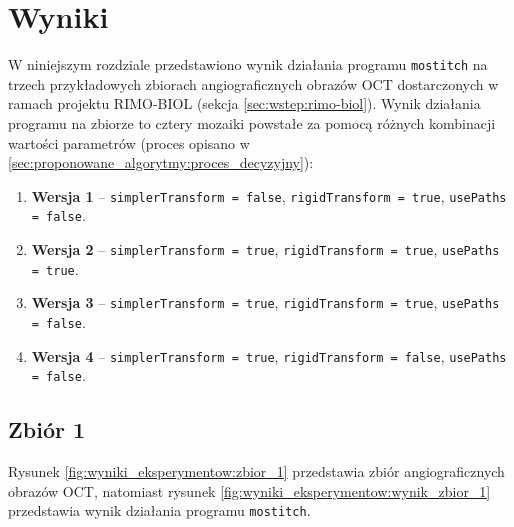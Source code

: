 %
\chapter{Wyniki}
\label{sec:wyniki_eksperymentow}

W niniejszym rozdziale przedstawiono wynik działania programu \texttt{mostitch} na trzech przykładowych zbiorach angiograficznych obrazów OCT dostarczonych w ramach projektu RIMO-BIOL (sekcja \ref{sec:wstep:rimo-biol}). Wynik działania programu na zbiorze to cztery mozaiki powstałe za pomocą różnych kombinacji wartości parametrów (proces opisano w \ref{sec:proponowane_algorytmy:proces_decyzyjny}):

\begin{enumerate}
\item \textbf{Wersja 1} -- \texttt{simplerTransform = false}, \texttt{rigidTransform = true}, \texttt{usePaths = false}. 
\item \textbf{Wersja 2} -- \texttt{simplerTransform = true}, \texttt{rigidTransform = true}, \texttt{usePaths = true}.
\item \textbf{Wersja 3} -- \texttt{simplerTransform = true}, \texttt{rigidTransform = true}, \texttt{usePaths = false}.
\item \textbf{Wersja 4} -- \texttt{simplerTransform = true}, \texttt{rigidTransform = false}, \texttt{usePaths = false}.
\end{enumerate}

\section{Zbiór 1}
\label{sec:zbior_1}

Rysunek \ref{fig:wyniki_eksperymentow:zbior_1} przedstawia zbiór angiograficznych obrazów OCT, natomiast rysunek \ref{fig:wyniki_eksperymentow:wynik_zbior_1} przedstawia wynik działania programu \texttt{mostitch}.

